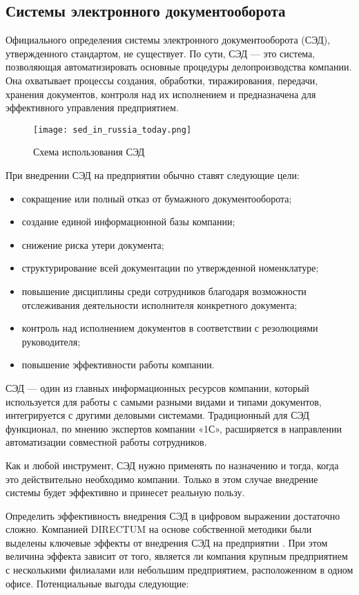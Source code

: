 \subsection{Системы электронного документооборота}
\label{sec:analysis:serv_arch}

Официального определения системы электронного документооборота (СЭД), утвержденного стандартом, не существует. По сути, СЭД — это система, позволяющая автоматизировать основные процедуры делопроизводства компании. Она охватывает процессы создания, обработки, тиражирования, передачи, хранения документов, контроля над их исполнением и предназначена для эффективного управления предприятием.


\begin{figure}[h!]
	\centering
	\texttt{[image: sed\_in\_russia\_today.png]}
	\caption{Схема использования СЭД}
\end{figure}

При внедрении СЭД на предприятии обычно ставят следующие цели:
\begin{itemize}
	\item сокращение или полный отказ от бумажного документооборота; 
	\item создание единой информационной базы компании; 
	\item снижение риска утери документа; 
	\item структурирование всей документации по утвержденной номенклатуре;
	\item повышение дисциплины среди сотрудников благодаря возможности отслеживания деятельности исполнителя конкретного документа;
	\item контроль над исполнением документов в соответствии с резолюциями руководителя;
	\item повышение эффективности работы компании.
\end{itemize}

СЭД — один из главных информационных ресурсов компании, который используется для работы с самыми разными видами и типами документов, интегрируется с другими деловыми системами. Традиционный для СЭД функционал, по мнению экспертов компании «1С», расширяется в направлении автоматизации совместной работы сотрудников.

Как и любой инструмент, СЭД нужно применять по назначению и тогда, когда это действительно необходимо компании. Только в этом случае внедрение системы будет эффективно и принесет реальную пользу.

Определить эффективность внедрения СЭД в цифровом выражении достаточно сложно. Компанией DIRECTUM на основе собственной методики были выделены ключевые эффекты от внедрения СЭД на предприятии \cite{directum}. При этом величина эффекта зависит от того, является ли компания крупным предприятием с несколькими филиалами или небольшим предприятием, расположенном в одном офисе. Потенциальные выгоды следующие:

